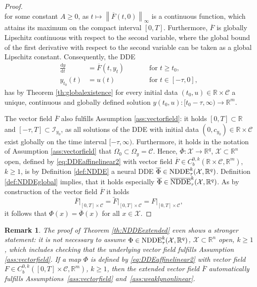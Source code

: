 \documentclass[10pt]{article}
\numberwithin{equation}{section}
\newcommand*{\dd}{\mathrm{d}}
\newtheorem{remark}[theorem]{Remark}
\newcommand\norm[1]{\left\lVert#1\right\rVert}
\begin{document}
\begin{proof}
\begin{equation*}
		\end{equation*}
		for some constant $A \geq 0$, as $t \mapsto \norm{\overline{F}(t,0)}_\infty$ is a continuous function, which attains its maximum on the compact interval $[0,T]$. Furthermore, $\overline{F}$ is globally Lipschitz continuous with respect to the second variable, where the global bound of the first derivative with respect to the second variable can be taken as a global Lipschitz constant. Consequently, the DDE 
		\begin{equation*}
			\begin{aligned}
				\frac{\dd y}{\dd t} &= \overline{F}(t,y_t) \qquad &&\text{for } t\geq t_0, \\  
				y_{t_0}(t) &= u(t) &&\text{for } t \in [-\tau,0],
			\end{aligned}
		\end{equation*}
		has by Theorem \ref{th:globalexistence} for every initial data $(t_0,u)\in\mathbb{R}\times \mathcal{C}$ a unique, continuous and globally defined solution $y(t_0,u):[t_0-\tau,\infty)\rightarrow \mathbb{R}^m$.
		
		The vector field $\overline{F}$ also fulfills Assumption \ref{ass:vectorfield}: it holds $[0,T]\subset \mathbb{R}$ and $[-\tau,T]\subset \mathcal{I}_{y_0}$, as all solutions of the DDE with initial data $(0,c_{y_0})\in\mathbb{R}\times\mathcal{C}$ exist globally on the time interval $[-\tau,\infty)$. Furthermore, it holds in the notation of Assumption \ref{ass:vectorfield} that $\Omega_0 \subset \Omega_y = \mathcal{C}$. Hence,  $\overline{\Phi}:\mathcal{X}\rightarrow \mathbb{R}^q$, $\mathcal{X}\subset \mathbb{R}^n$ open, defined by \eqref{eq:DDEaffinelinear2} with vector field $\overline{F}\in C_b^{0,k}(\mathbb{R}\times \mathcal{C},\mathbb{R}^m)$, $k\geq 1$, is by Definition \ref{def:NDDE} a neural DDE $\overline{\Phi}\in \textup{NDDE}_\tau^k(\mathcal{X},\mathbb{R}^q)$. Definition \ref{def:NDDEglobal} implies, that it holds especially $\overline{\Phi}\in \overline{\textup{NDDE}}_\tau^k(\mathcal{X},\mathbb{R}^q)$. As by construction of the vector field $\overline{F}$ it holds 
		\begin{equation*}
			\overline{F}\big\vert_{[0,T]\times \mathcal{C}} = \widetilde{F}\big\vert_{[0,T]\times \mathcal{C}} = F\big\vert_{[0,T]\times \mathcal{C}},
		\end{equation*}
		it follows that $\Phi(x) = \overline{\Phi}(x)$ for all $x \in \mathcal{X}$.
	\end{proof}
	
	\begin{remark}
		The proof of Theorem \ref{th:NDDEextended} even shows a stronger statement: it is not necessary to assume $\Phi \in \textup{NDDE}_\tau^k(\mathcal{X},\mathbb{R}^q)$, $\mathcal{X}\subset \mathbb{R}^n$ open, $k\geq1$, which includes checking that the underlying vector field fulfills Assumption \ref{ass:vectorfield}. If a map $\Phi$ is defined by \eqref{eq:DDEaffinelinear2} with vector field $F\in C_b^{0,k}([0,T] \times \mathcal{C},\mathbb{R}^m)$, $k\geq 1$, then the extended vector field $\overline{F}$ automatically fulfills Assumptions~\ref{ass:vectorfield} and~\ref{ass:weaklynonlinear}. 
	\end{remark}
	
\end{document}

